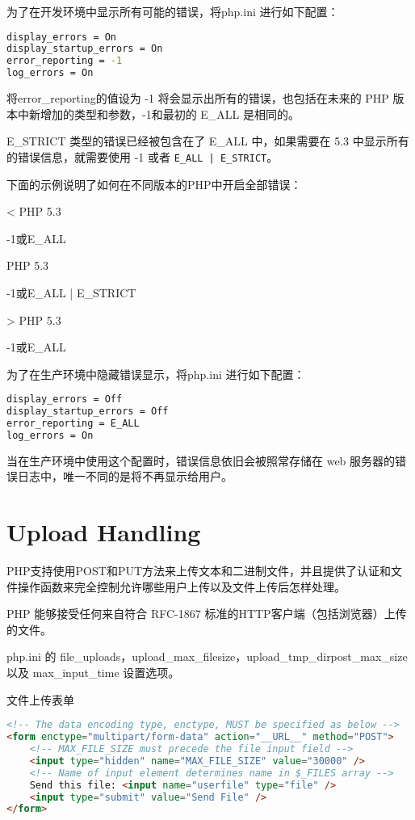 为了在开发环境中显示所有可能的错误，将php.ini 进行如下配置：

\begin{lstlisting}[language=bash]
display_errors = On
display_startup_errors = On
error_reporting = -1
log_errors = On
\end{lstlisting}

将error\_reporting的值设为 -1 将会显示出所有的错误，也包括在未来的 PHP 版本中新增加的类型和参数，-1和最初的 E\_ALL 是相同的。

E\_STRICT 类型的错误已经被包含在了 E\_ALL 中，如果需要在 5.3 中显示所有的错误信息，就需要使用 -1 或者 \texttt{E\_ALL | E\_STRICT}。

下面的示例说明了如何在不同版本的PHP中开启全部错误：

\begin{compactitem}
\item < PHP 5.3 

-1或E\_ALL
\item PHP 5.3 

-1或E\_ALL | E\_STRICT

\item > PHP 5.3

-1或E\_ALL
\end{compactitem}

为了在生产环境中隐藏错误显示，将php.ini 进行如下配置：

\begin{lstlisting}[language=bash]
display_errors = Off
display_startup_errors = Off
error_reporting = E_ALL
log_errors = On
\end{lstlisting}

当在生产环境中使用这个配置时，错误信息依旧会被照常存储在 web 服务器的错误日志中，唯一不同的是将不再显示给用户。




\section{Upload Handling}

PHP支持使用POST和PUT方法来上传文本和二进制文件，并且提供了认证和文件操作函数来完全控制允许哪些用户上传以及文件上传后怎样处理。

PHP 能够接受任何来自符合 RFC-1867 标准的HTTP客户端（包括浏览器）上传的文件。

php.ini 的 file\_uploads，upload\_max\_filesize，upload\_tmp\_dirpost\_max\_size 以及 max\_input\_time 设置选项。

\begin{example}
文件上传表单
\begin{lstlisting}[language=HTML]
<!-- The data encoding type, enctype, MUST be specified as below -->
<form enctype="multipart/form-data" action="__URL__" method="POST">
    <!-- MAX_FILE_SIZE must precede the file input field -->
    <input type="hidden" name="MAX_FILE_SIZE" value="30000" />
    <!-- Name of input element determines name in $_FILES array -->
    Send this file: <input name="userfile" type="file" />
    <input type="submit" value="Send File" />
</form>
\end{lstlisting}
\end{example}



